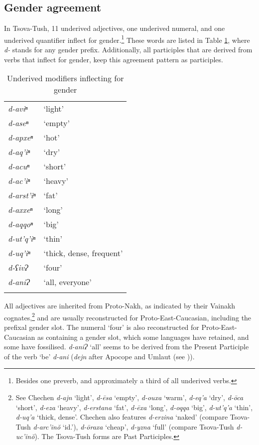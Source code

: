 \subsection{Gender agreement} \label{genderagree}

In Tsova-Tush, 11 underived adjectives, one underived numeral, and one underived quantifier inflect for gender.\footnote{Besides one preverb, and approximately a third of all underived verbs.
} These words are listed in Table \ref{simplenp-table1}, where \textit{d-} stands for any gender prefix. Additionally, all participles that are derived from verbs that inflect for gender, keep this agreement pattern as participles. 

\begin{table}
	\begin{tabular}{ll}
		\lsptoprule
		\textit{d-aviⁿ} & `light' \\
		\textit{d-aseⁿ} & `empty' \\
		\textit{d-apxeⁿ} & `hot' \\
		\textit{d-aq'iⁿ} & `dry' \\
		\textit{d-acuⁿ} & `short' \\
		\textit{d-ac'iⁿ} & `heavy' \\
		\textit{d-arst'iⁿ} & `fat' \\
		\textit{d-axxeⁿ} & `long' \\
		\textit{d-aqqoⁿ} & `big' \\
		\textit{d-ut'q'iⁿ} & `thin' \\
		\textit{d-uq'iⁿ} & `thick, dense, frequent' \\\addlinespace
		\textit{d-ʕivɁ} & `four' \\\addlinespace
		\textit{d-aniɁ} & `all, everyone' \\
		\lspbottomrule
	\end{tabular}
	\caption{Underived modifiers inflecting for gender}
	\label{simplenp-table1}
\end{table}

All adjectives are inherited from Proto-Nakh, as indicated by their Vainakh cognates,\footnote{See Chechen \textit{d-ajn} `light',  \textit{d-\={e}sa} `empty', \textit{d-ouxa} `warm', \textit{d-eq'a} `dry', \textit{d-\={o}ca} `short',  \textit{d-eza} `heavy', \textit{d-erstana} `fat', \textit{d-\={e}xa} `long', \textit{d-oqqa} `big', \textit{d-ut'q'a} `thin', \textit{d-uq'a} `thick, dense'. Chechen also features  \textit{d-erzina} `naked' (compare Tsova-Tush \textit{d-arc'in\u{o}} `id.'), \textit{d-\={o}raxa} `cheap', \textit{d-yzna} `full' (compare Tsova-Tush \textit{d-uc'in\u{o}}). The Tsova-Tush forms are Past Participles.} and are usually reconstructed for Proto-East-Caucasian, including the prefixal gender slot. The numeral `four' is also reconstructed for Proto-East-Caucasian as containing a gender slot, which some languages have retained, and some have fossilised. \textit{d-aniɁ} `all' seems to be derived from the Present Participle of the verb `be' \textit{d-ani} (\textit{dejn} after Apocope and Umlaut (see )).\largerpage


